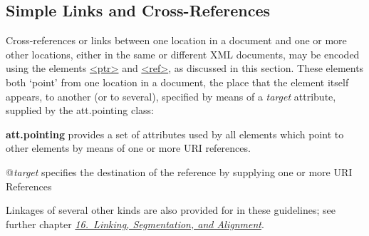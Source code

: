 \subsection[{Simple Links and Cross-References}]{Simple Links and Cross-References}\label{COXR}\par
Cross-references or links between one location in a document and one or more other locations, either in the same or different XML documents, may be encoded using the elements \hyperref[TEI.ptr]{<ptr>} and \hyperref[TEI.ref]{<ref>}, as discussed in this section. These elements both ‘point’ from one location in a document, the place that the element itself appears, to another (or to several), specified by means of a {\itshape target} attribute, supplied by the \textsf{att.pointing} class: 
\begin{sansreflist}
  
\item [\textbf{att.pointing}] provides a set of attributes used by all elements which point to other elements by means of one or more URI references.\hfil\\[-10pt]\begin{sansreflist}
    \item[@{\itshape target}]
  specifies the destination of the reference by supplying one or more URI References
\end{sansreflist}  
\end{sansreflist}
 Linkages of several other kinds are also provided for in these guidelines; see further chapter \textit{\hyperref[SA]{16.\ Linking, Segmentation, and Alignment}}.\par
